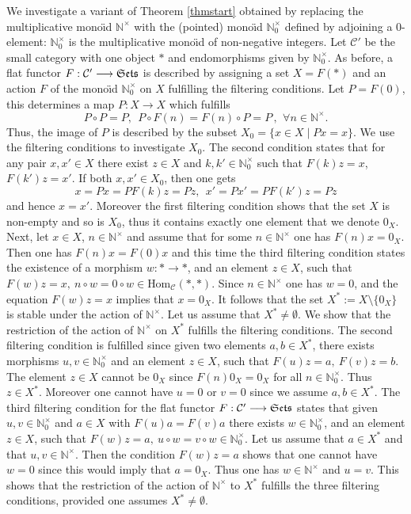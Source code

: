 \documentclass[noams,lp]{compositio}
\def\Hom{{\rm Hom}}
\def\N{{\mathbb N}}
\def\cC{{\mathcal C}}
\def\qqq{\,,\,~\forall}
\def\Hom {{\mbox{Hom}}}
\def\Se{\frak{ Sets}}
\def\nt{\N^{\times}}
\def\nto{\N_0^{\times}}
\begin{document}
We investigate a variant of  Theorem \ref{thmstart} obtained by replacing the multiplicative mono\"{\i}d $\nt$ with the (pointed) mono\"{\i}d $\nto$ defined by adjoining a $0$-element: $\nto$ is the multiplicative mono\"{\i}d of non-negative integers. Let $\cC'$ be the  small category  with one object $\ast$ and endomorphisms given by $\nto$.  As before, a flat functor $F:\cC'\longrightarrow \Se$ is described by assigning a set $X=F(\ast)$ and an action $F$ of the mono\"{\i}d $\nto$ on $X$ fulfilling the filtering conditions. Let $P=F(0)$, this determines a map $P:X\to X$ which fulfills
$$
P\circ P=P, \   \  P\circ F(n)=F(n)\circ P=P\qqq n\in \nt.
$$
Thus, the image of $P$ is described by the subset $X_0=\{x\in X\mid Px=x\}$. We use the filtering conditions to investigate $X_0$. The second  condition states that
for any pair $x,x'\in X$ there exist $z\in X$ and $k,k'\in \nto$ such that $F(k)z=x$, $F(k')z=x'$. If   both $x,x'\in X_0$, then one gets
$$
x=Px=PF(k)z=Pz, \  \ x'=Px'=PF(k')z=Pz
$$
and  hence $x=x'$. Moreover the first filtering condition shows that the set $X$ is non-empty and  so is $X_0$,  thus it contains exactly one element that we denote $0_X$. Next, let $ x\in X$, $n\in \nt$ and assume that for some $n\in \nt$ one has $F(n)x=0_X$. Then one has $F(n)x=F(0)x$ and this time the third filtering condition states the existence of a morphism $w:*\to *$,  and an element $z\in X$, such that 
$
F(w)z=x, ~n\circ w=0\circ w\in \Hom_\cC(*,*)
$. Since $n\in \nt$ one has 
 $w=0$, and the equation $F(w)z=x$ implies that $x=0_X$.  It follows that the set  $X^*:=X\setminus \{0_X\}$ is stable under the action of $\nt$. Let us assume that $X^*\neq \emptyset$. We show that  the restriction of the action of $\nt$ on $X^*$ fulfills   the filtering conditions. The second filtering condition is fulfilled since given two  elements $a,b\in X^*$, there exists
 morphisms $u, v\in \nto$ and an element $z\in X$, such that 
$
F(u)z=a, ~  F(v)z=b.
$
The element $z\in X$ cannot be $0_X$ since $F(n)0_X=0_X$ for all $n\in \nto$. Thus $z\in X^*$. Moreover one cannot have $u=0$ or $v=0$ since we assume $a,b\in X^*$. The third filtering condition for the flat functor $F:\cC'\longrightarrow \Se$ states that given   $u,v\in \nto$ and $a\in X$ with $F(u)a=F(v)a$ there
exists  $w\in \nto$,  and an element $z\in X$, such that 
$
F(w)z=a, ~  u\circ w=v\circ w\in \nto
$.
Let us assume that $a\in X^*$ and that $u,v\in \nt$. Then the condition $F(w)z=a$ shows that one cannot have $w=0$ since this would imply that $a=0_X$. Thus one has $w\in \nt$ and $u=v$. This shows that the restriction of the action of $\nt$ to $X^*$ fulfills the three filtering conditions, provided one assumes  $X^*\neq \emptyset$. 
\end{document}

